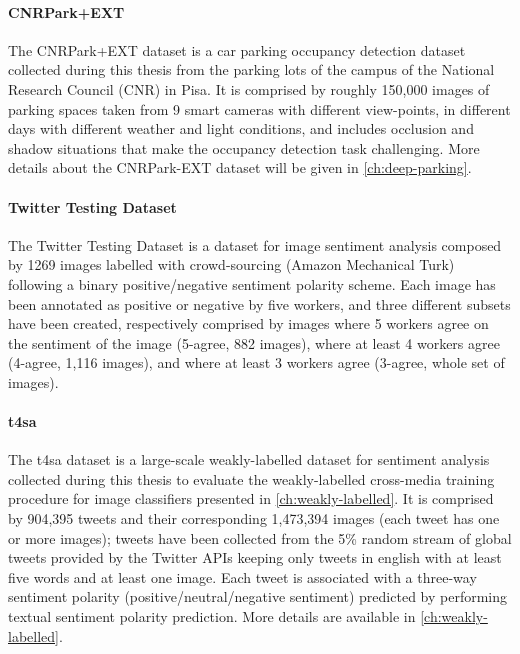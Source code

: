\paragraph{CNRPark+EXT~\cite{amato2016car,amato2017deep}}
The CNRPark+EXT dataset is a car parking occupancy detection dataset collected during this thesis from the parking lots of the campus of the National Research Council (CNR) in Pisa.
It is comprised by roughly 150,000 images of parking spaces taken from 9 smart cameras with different view-points, in different days with different weather and light conditions, and includes occlusion and shadow situations that make the occupancy detection task challenging.
More details about the CNRPark-EXT dataset will
be given in \ref{ch:deep-parking}.

\paragraph{Twitter Testing Dataset~\cite{you2015robust}}
The Twitter Testing Dataset is a dataset for image sentiment analysis composed by 1269 images labelled with crowd-sourcing (Amazon Mechanical Turk) following a binary positive/negative sentiment polarity scheme.
Each image has been annotated as positive or negative by five workers, and three different subsets have been created, respectively comprised by images where 5 workers agree on the sentiment of the image (5-agree, 882 images), where at least 4 workers agree (4-agree, 1,116 images), and where at least 3 workers agree (3-agree, whole set of images).

\paragraph{\acrfull{t4sa}~\cite{vadicamo2017cross}}
The \acrlong{t4sa} dataset is a large-scale weakly-labelled dataset for sentiment analysis collected during this thesis to evaluate the weakly-labelled cross-media training procedure for image classifiers presented in \ref{ch:weakly-labelled}.
It is comprised by 904,395 tweets and their corresponding 1,473,394 images (each tweet has one or more images);
tweets have been collected from the 5\% random stream of global tweets provided by the Twitter APIs keeping only tweets in english with at least five words and at least one image.
Each tweet is associated with a three-way sentiment polarity (positive/neutral/negative sentiment) predicted by performing textual sentiment polarity prediction.
More details are available in \ref{ch:weakly-labelled}.

